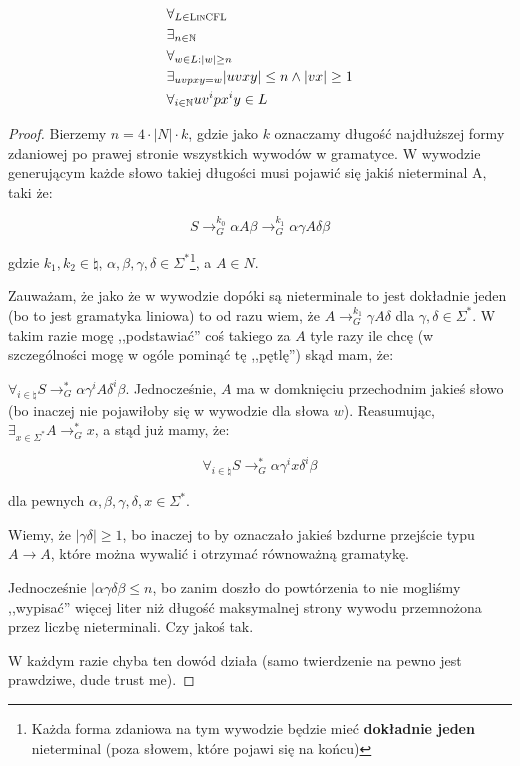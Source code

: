 \begin{theorem}
    \large
    \[ 
    \begin{split}
        &\forall_{L \in \textsc{LinCFL}}  \\
        &\exists_{n \in \natural} \\
        &\forall_{w \in L : |w| \geq n} \\
        &\exists_{uvpxy = w} |uvxy| \leq n \land |vx| \geq 1 \\
        &\forall_{i \in \natural} uv^ipx^iy \in L
    \end{split}
     \]
        
\end{theorem}

\begin{proof}
    Bierzemy \(n = 4 \cdot |N| \cdot k \), gdzie jako \(k\) oznaczamy długość najdłuższej formy zdaniowej po prawej stronie wszystkich wywodów w gramatyce. W wywodzie generującym każde słowo takiej długości musi pojawić się jakiś nieterminal A, taki że:
    
    \[ 
        S \rightarrow_{G}^{k_0}\alpha A \beta \rightarrow_{G}^{k_1} \alpha \gamma A \delta \beta 
    \]
    
    gdzie \(k_1, k_2 \in \natural\), \(\alpha, \beta, \gamma, \delta \in \Sigma^* \)\footnote{Każda forma zdaniowa na tym wywodzie będzie mieć \textbf{dokładnie jeden} nieterminal (poza słowem, które pojawi się na końcu)}, a \(A \in N\). 
    
    Zauważam, że jako że w wywodzie dopóki są nieterminale to jest dokładnie jeden (bo to jest gramatyka liniowa) to od razu wiem, że \( A \rightarrow_G^{k_1} \gamma A \delta \) dla \( \gamma, \delta \in \Sigma^* \). W takim razie mogę ,,podstawiać'' coś takiego za \(A\) tyle razy ile chcę (w szczególności mogę w ogóle pominąć tę ,,pętlę'') skąd mam, że: 
    
    \(\forall_{i \in \natural} S \rightarrow_{G}^* \alpha \gamma^i A \delta^i \beta \). Jednocześnie, \(A\) ma w domknięciu przechodnim jakieś słowo (bo inaczej nie pojawiłoby się w wywodzie dla słowa \(w\)). Reasumując, \( \exists_{x \in \Sigma^*} A \rightarrow_G^* x \), a stąd już mamy, że: 
    
    \[ 
        \forall_{i \in \natural} S \rightarrow_{G}^* \alpha \gamma^i x \delta^i \beta 
    \] 
    
    dla pewnych \( \alpha, \beta, \gamma, \delta, x \in \Sigma^* \). 
    
    Wiemy, że \( |\gamma\delta| \geq 1 \), bo inaczej to by oznaczało jakieś bzdurne przejście typu \( A \rightarrow A\), które można wywalić i otrzymać równoważną gramatykę. 
    
    Jednocześnie \( |\alpha\gamma\delta\beta \leq n\), bo zanim doszło do powtórzenia to nie mogliśmy ,,wypisać'' więcej liter niż długość maksymalnej strony wywodu przemnożona przez liczbę nieterminali. Czy jakoś tak.
    
    W każdym razie chyba ten dowód działa (samo twierdzenie na pewno jest prawdziwe, dude trust me). 
\end{proof}

